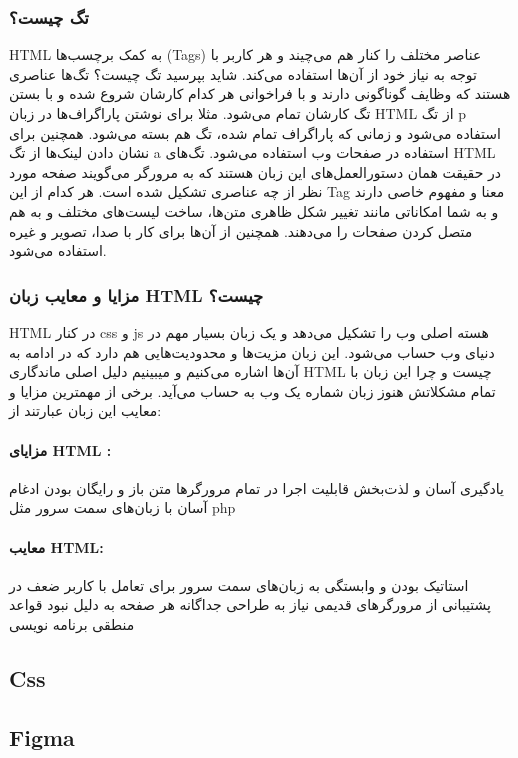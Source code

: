 \subsubsection{تگ چیست؟}
HTML به کمک برچسب‌‌ها (Tags) عناصر مختلف را کنار هم می‌چیند و هر کاربر با توجه به نیاز خود از آن‌ها استفاده می‌کند. شاید بپرسید تگ چیست؟ تگ‌ها عناصری هستند که وظایف گوناگونی دارند و با فراخوانی هر کدام کارشان شروع شده و با بستن تگ کارشان تمام می‌شود. مثلا برای نوشتن پاراگراف‌ها در زبان HTML از تگ p استفاده می‌شود و زمانی که پاراگراف تمام شده، تگ هم بسته می‌شود. همچنین برای نشان دادن لینک‌ها از تگ a استفاده در صفحات وب استفاده می‌شود.
تگ‌های HTML در حقیقت همان دستورالعمل‌های این زبان هستند که به مرورگر می‌گویند صفحه مورد نظر از چه عناصری تشکیل شده است. هر کدام از این Tag معنا و مفهوم خاصی دارند و به شما امکاناتی مانند تغییر شکل ظاهری متن‌ها، ساخت لیست‌های مختلف و به هم متصل کردن صفحات را می‌دهند. همچنین از آن‌ها برای کار با صدا، تصویر و غیره استفاده می‌شود.


\subsubsection{مزایا و معایب زبان HTML چیست؟}
HTML در کنار css و js هسته اصلی وب را تشکیل می‌دهد و یک زبان بسیار مهم در دنیای وب حساب می‌شود. این زبان مزیت‌ها و محدودیت‌هایی هم دارد که در ادامه به آن‌ها اشاره می‌کنیم و میبینیم دلیل اصلی ماندگاری HTML چیست و چرا این زبان با تمام مشکلاتش هنوز زبان شماره یک وب به حساب می‌آید. برخی از مهمترین مزایا و معایب این زبان عبارتند از:

\paragraph{مزایای HTML :}
یادگیری آسان و لذت‌بخش
قابلیت اجرا در تمام مرورگرها
متن باز و رایگان بودن
ادغام آسان با زبان‌های سمت سرور مثل 
php

\paragraph{معایب HTML:}
استاتیک بودن و وابستگی به زبان‌های سمت سرور برای تعامل با کاربر
ضعف در پشتیبانی از مرورگرهای قدیمی
نیاز به طراحی جداگانه هر صفحه به دلیل نبود قواعد منطقی برنامه نویسی


\subsection{Css}
\subsection{Figma}

